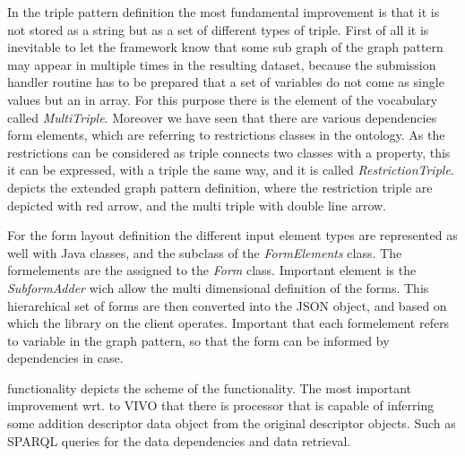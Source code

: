 In the triple pattern definition the most fundamental improvement is that it is not stored as a string but as a set of different types of triple. First of all it is inevitable to let the framework know that some sub graph of the graph pattern may appear in multiple times in the resulting dataset, because the submission handler routine has to be prepared that a set of variables do not come as single values but an in array. For this purpose there is the element of the vocabulary called \textit{MultiTriple}. Moreover we have seen that there are various dependencies form elements, which are referring to restrictions classes in the ontology. As the restrictions can be considered as triple connects two classes with a property, this it can be expressed, with a triple the same way, and it is called \textit{RestrictionTriple}.  depicts the extended graph pattern definition, where the restriction triple are depicted with red arrow, and the multi triple with double line arrow.


For the form layout definition the different input element types are represented as well with Java classes, and the subclass of the \textit{FormElements} class. The formelements are the assigned to the \textit{Form} class. Important element is the \textit{SubformAdder} wich allow the multi dimensional definition of the forms. This hierarchical set of forms are then converted into the JSON object, and based on which the library on the client operates. Important that each formelement refers to variable in the graph pattern, so that the form can be informed by dependencies in case. 

 functionality depicts the scheme of the functionality. The most important improvement wrt. to VIVO that there is processor that is capable of inferring some addition descriptor data object from the original descriptor objects. Such as SPARQL queries for the data dependencies and data retrieval.  



